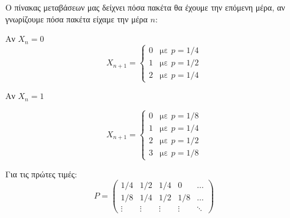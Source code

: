 \documentclass[11pt,a4paper]{article}
\begin{document}
Ο πίνακας μεταβάσεων μας δείχνει πόσα πακέτα θα έχουμε την επόμενη μέρα, αν γνωρίζουμε πόσα πακέτα είχαμε την μέρα $n$:

Αν $X_n = 0$
\begin{equation*}
    X_{n+1} =
    \begin{cases}
        0 & \text{με $p=1/4$} \\
        1 & \text{με $p=1/2$} \\
        2 & \text{με $p=1/4$}
    \end{cases}
\end{equation*}

Αν $X_n = 1$

\begin{equation*}
    X_{n+1} =
    \begin{cases}
        0 & \text{με $p=1/8$} \\
        1 & \text{με $p=1/4$} \\
        2 & \text{με $p=1/2$} \\
        3 & \text{με $p=1/8$}
    \end{cases}
\end{equation*}

Για τις πρώτες τιμές:
\begin{equation*}
    P =
    \begin{pmatrix}
        1/4    & 1/2    & 1/4    & 0      & \dots  \\
        1/8    & 1/4    & 1/2    & 1/8    & \dots  \\
        \vdots & \vdots & \vdots & \vdots & \ddots
    \end{pmatrix}
\end{equation*}
\end{document}
